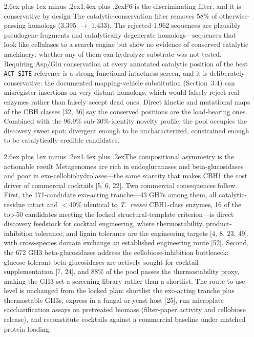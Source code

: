 \documentclass[11pt]{article}
\makeatletter
\renewcommand{\subsection}{\@startsection{subsection}{2}{\z@}%
  {2.6ex plus 1ex minus .2ex}{1.4ex plus .2ex}{\large\bfseries\color{navy}}}
\makeatother
\begin{document}
\subsection{F6 is the discriminating filter, and it is conservative by design}
The catalytic-conservation filter removes 58\% of otherwise-passing homologs (3,395 $\to$ 1,433). The rejected 1,962 sequences are plausibly pseudogene fragments and catalytically degenerate homologs---sequences that look like cellulases to a search engine but show no evidence of conserved catalytic machinery; whether any of them can hydrolyze substrate was not tested. Requiring Asp/Glu conservation at every annotated catalytic position of the best \texttt{ACT\_SITE} reference is a strong functional-intactness screen, and it is deliberately conservative: the documented mapping-vehicle substitution (Section~3.4) can misregister insertions on very distant homologs, which would falsely reject real enzymes rather than falsely accept dead ones. Direct kinetic and mutational maps of the CBH classes [32, 36] say the conserved positions are the load-bearing ones. Combined with the 96.9\% sub-30\%-identity novelty profile, the pool occupies the discovery sweet spot: divergent enough to be uncharacterized, constrained enough to be catalytically credible candidates.

\subsection{The compositional asymmetry is the actionable result}
Metagenomes are rich in endoglucanases and beta-glucosidases and poor in exo-cellobiohydrolases---the same scarcity that makes CBH1 the cost driver of commercial cocktails [5, 6, 22]. Two commercial consequences follow. First, the 171-candidate exo-acting tranche---43 GH7s among them, all catalytic-residue intact and $<$40\% identical to \textit{T.\ reesei} CBH1-class enzymes, 16 of the top-50 candidates meeting the locked structural-template criterion---is direct discovery feedstock for cocktail engineering, where thermostability, product-inhibition tolerance, and lignin tolerance are the engineering targets [4, 8, 23, 49], with cross-species domain exchange an established engineering route [52]. Second, the 672 GH3 beta-glucosidases address the cellobiose-inhibition bottleneck: glucose-tolerant beta-glucosidases are actively sought for cocktail supplementation [7, 24], and 88\% of the pool passes the thermostability proxy, making the GH3 set a screening library rather than a shortlist. The route to use-level is unchanged from the locked plan: shortlist the exo-acting tranche plus thermostable GH3s, express in a fungal or yeast host [25], run microplate saccharification assays on pretreated biomass (filter-paper activity and cellobiose release), and reconstitute cocktails against a commercial baseline under matched protein loading.
\end{document}
